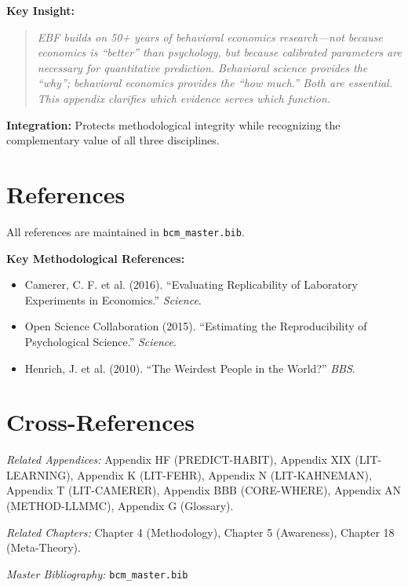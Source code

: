\documentclass[11pt, a4paper]{article}
\begin{document}
\begin{tcolorbox}[colback=green!10!white, colframe=green!75!black,
    title=\textbf{Appendix XX: Summary}]
\textbf{Key Insight:}
\begin{quote}
\textit{EBF builds on 50+ years of behavioral economics research---not because economics is ``better'' than psychology, but because calibrated parameters are necessary for quantitative prediction. Behavioral science provides the ``why''; behavioral economics provides the ``how much.'' Both are essential. This appendix clarifies which evidence serves which function.}
\end{quote}

\textbf{Integration:} Protects methodological integrity while recognizing the complementary value of all three disciplines.

\end{tcolorbox}


\section{References}
\label{sec:evd-references}

All references are maintained in \texttt{bcm\_master.bib}.

\textbf{Key Methodological References:}
\begin{itemize}[nosep]
    \item Camerer, C. F. et al. (2016). ``Evaluating Replicability of Laboratory Experiments in Economics.'' \textit{Science}.
    \item Open Science Collaboration (2015). ``Estimating the Reproducibility of Psychological Science.'' \textit{Science}.
    \item Henrich, J. et al. (2010). ``The Weirdest People in the World?'' \textit{BBS}.
\end{itemize}


\section{Cross-References}
\label{sec:evd-crossref}

\noindent\textit{Related Appendices:}
Appendix HF (PREDICT-HABIT),
Appendix XIX (LIT-LEARNING),
Appendix K (LIT-FEHR),
Appendix N (LIT-KAHNEMAN),
Appendix T (LIT-CAMERER),
Appendix BBB (CORE-WHERE),
Appendix AN (METHOD-LLMMC),
Appendix G (Glossary).

\noindent\textit{Related Chapters:}
Chapter 4 (Methodology),
Chapter 5 (Awareness),
Chapter 18 (Meta-Theory).

\noindent\textit{Master Bibliography:} \texttt{bcm\_master.bib}

\nocite{bcm_master}

\end{document}
